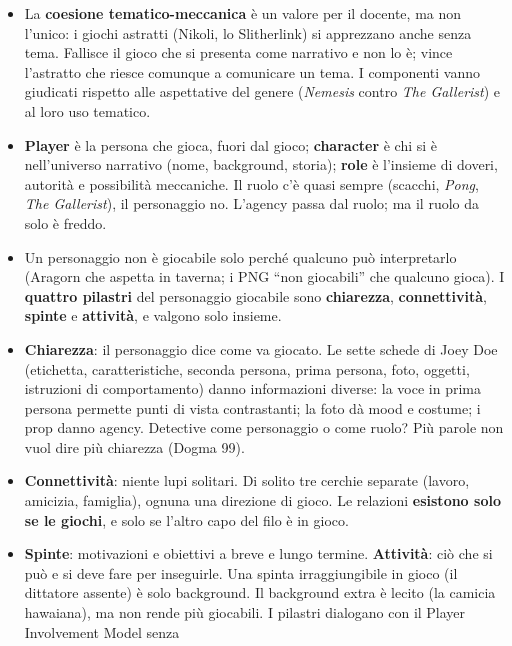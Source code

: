 \begin{itemize}
  \item La \textbf{coesione tematico-meccanica} è un valore per il docente, ma non
        l'unico: i giochi astratti (Nikoli, lo Slitherlink) si apprezzano anche
        senza tema. Fallisce il gioco che si presenta come narrativo e non lo è;
        vince l'astratto che riesce comunque a comunicare un tema. I componenti
        vanno giudicati rispetto alle aspettative del genere (\emph{Nemesis} contro
        \emph{The Gallerist}) e al loro uso tematico.
  \item \textbf{Player} è la persona che gioca, fuori dal gioco; \textbf{character}
        è chi si è nell'universo narrativo (nome, background, storia);
        \textbf{role} è l'insieme di doveri, autorità e possibilità meccaniche.
        Il ruolo c'è quasi sempre (scacchi, \emph{Pong}, \emph{The Gallerist}),
        il personaggio no. L'agency passa dal ruolo; ma il ruolo da solo è freddo.
  \item Un personaggio non è giocabile solo perché qualcuno può interpretarlo
        (Aragorn che aspetta in taverna; i PNG ``non giocabili'' che qualcuno
        gioca). I \textbf{quattro pilastri} del personaggio giocabile sono
        \textbf{chiarezza}, \textbf{connettività}, \textbf{spinte} e
        \textbf{attività}, e valgono solo insieme.
  \item \textbf{Chiarezza}: il personaggio dice come va giocato. Le sette schede di
        Joey Doe (etichetta, caratteristiche, seconda persona, prima persona, foto,
        oggetti, istruzioni di comportamento) danno informazioni diverse: la voce in
        prima persona permette punti di vista contrastanti; la foto dà mood e
        costume; i prop danno agency. Detective come personaggio o come ruolo? Più
        parole non vuol dire più chiarezza (Dogma 99).
  \item \textbf{Connettività}: niente lupi solitari. Di solito tre cerchie separate
        (lavoro, amicizia, famiglia), ognuna una direzione di gioco. Le relazioni
        \textbf{esistono solo se le giochi}, e solo se l'altro capo del filo è in
        gioco.
  \item \textbf{Spinte}: motivazioni e obiettivi a breve e lungo termine.
        \textbf{Attività}: ciò che si può e si deve fare per inseguirle. Una spinta
        irraggiungibile in gioco (il dittatore assente) è solo background. Il
        background extra è lecito (la camicia hawaiana), ma non rende più
        giocabili. I pilastri dialogano con il Player Involvement Model senza

\end{itemize}
